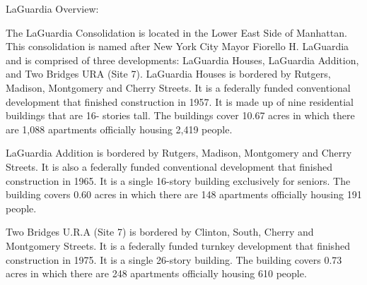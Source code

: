 LaGuardia Overview:   

 

The LaGuardia Consolidation is located in the Lower East Side of Manhattan. This consolidation is named after New York City Mayor Fiorello H. LaGuardia and is comprised of three developments: LaGuardia Houses, LaGuardia Addition, and Two Bridges URA (Site 7). LaGuardia Houses is bordered by Rutgers, Madison, Montgomery and Cherry Streets. It is a federally funded conventional development that finished construction in 1957. It is made up of nine residential buildings that are 16- stories tall. The buildings cover 10.67 acres in which there are 1,088 apartments officially housing 2,419 people.    

   

LaGuardia Addition is bordered by Rutgers, Madison, Montgomery and Cherry Streets. It is also a federally funded conventional development that finished construction in 1965. It is a single 16-story building exclusively for seniors. The building covers 0.60 acres in which there are 148 apartments officially housing 191 people.    



Two Bridges U.R.A (Site 7) is bordered by Clinton, South, Cherry and Montgomery Streets. It is a federally funded turnkey development that finished construction in 1975. It is a single 26-story building. The building covers 0.73 acres in which there are 248 apartments officially housing 610 people.